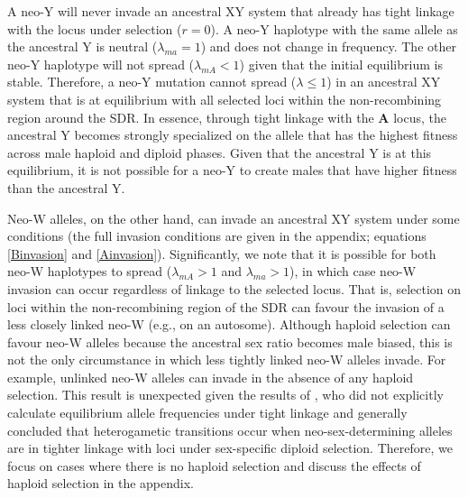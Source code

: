 \documentclass[12pt]{article}
\begin{document}
A neo-Y will never invade an ancestral XY system that already has tight linkage with the locus under selection ($r=0$). 
A neo-Y haplotype with the same allele as the ancestral Y is neutral ($\lambda_{ma}=1$) and does not change in frequency.
The other neo-Y haplotype will not spread ($\lambda_{mA}<1$) given that the initial equilibrium is stable. 
Therefore, a neo-Y mutation cannot spread ($\lambda \leq 1$) in an ancestral XY system that is at equilibrium with all selected loci within the non-recombining region around the SDR.
In essence, through tight linkage with the \textbf{A} locus, the ancestral Y becomes strongly specialized on the allele that has the highest fitness across male haploid and diploid phases. 
Given that the ancestral Y is at this equilibrium, it is not possible for a neo-Y to create males that have higher fitness than the ancestral Y. 


Neo-W alleles, on the other hand, can invade an ancestral XY system under some conditions (the full invasion conditions are given in the appendix; equations \ref{Binvasion} and \ref{Ainvasion}). 
Significantly, we note that it is possible for both neo-W haplotypes to spread ($\lambda_{mA}>1$ and $\lambda_{ma}>1$), in which case neo-W invasion can occur regardless of linkage to the selected locus.
That is, selection on loci within the non-recombining region of the SDR can favour the invasion of a less closely linked neo-W (e.g., on an autosome). 
Although haploid selection can favour neo-W alleles because the ancestral sex ratio becomes male biased, this is not the only circumstance in which less tightly linked neo-W alleles invade. 
For example, unlinked neo-W alleles can invade in the absence of any haploid selection. 
This result is unexpected given the results of \cite{vanDoorn:2010hu}, who did not explicitly calculate equilibrium allele frequencies under tight linkage and generally concluded that heterogametic transitions occur when neo-sex-determining alleles are in tighter linkage with loci under sex-specific diploid selection. 
Therefore, we focus on cases where there is no haploid selection and discuss the effects of haploid selection in the appendix. 
\end{document}
